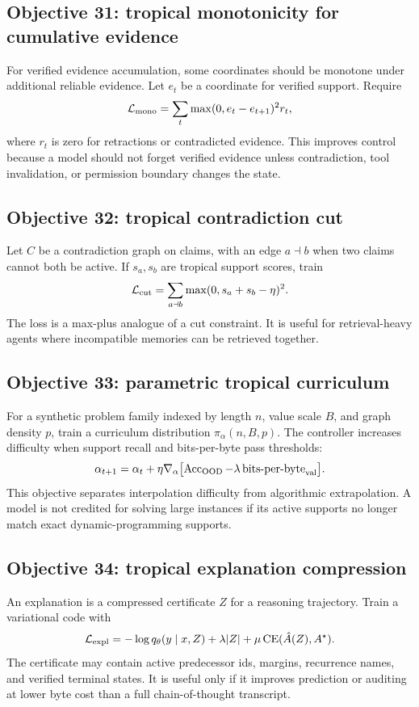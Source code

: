 \documentclass[11pt]{article}
\newcommand{\calL}{\mathcal{L}}
\begin{document}
\subsection{Objective 31: tropical monotonicity for cumulative evidence}
For verified evidence accumulation, some coordinates should be monotone under additional reliable evidence. Let $e_t$ be a coordinate for verified support. Require
\begin{equation}
\calL_{\rm mono}=\sum_t\max(0,e_t-e_{t+1})^2 r_t,
\end{equation}
where $r_t$ is zero for retractions or contradicted evidence. This improves control because a model should not forget verified evidence unless contradiction, tool invalidation, or permission boundary changes the state.

\subsection{Objective 32: tropical contradiction cut}
Let $C$ be a contradiction graph on claims, with an edge $a\dashv b$ when two claims cannot both be active. If $s_a,s_b$ are tropical support scores, train
\begin{equation}
\calL_{\rm cut}=\sum_{a\dashv b}\max(0,s_a+s_b-\eta)^2.
\end{equation}
The loss is a max-plus analogue of a cut constraint. It is useful for retrieval-heavy agents where incompatible memories can be retrieved together.

\subsection{Objective 33: parametric tropical curriculum}
For a synthetic problem family indexed by length $n$, value scale $B$, and graph density $p$, train a curriculum distribution $\pi_\alpha(n,B,p)$. The controller increases difficulty when support recall and bits-per-byte pass thresholds:
\begin{equation}
\alpha_{t+1}=\alpha_t+\eta\nabla_\alpha\bigl[\operatorname{Acc}_{\rm OOD}-\lambda\operatorname{bits-per-byte}_{\rm val}\bigr].
\end{equation}
This objective separates interpolation difficulty from algorithmic extrapolation. A model is not credited for solving large instances if its active supports no longer match exact dynamic-programming supports.

\subsection{Objective 34: tropical explanation compression}
An explanation is a compressed certificate $Z$ for a reasoning trajectory. Train a variational code with
\begin{equation}
\calL_{\rm expl}=-\log q_\theta(y\mid x,Z)+\lambda |Z|+\mu\operatorname{CE}(\hat A(Z),A^\star).
\end{equation}
The certificate may contain active predecessor ids, margins, recurrence names, and verified terminal states. It is useful only if it improves prediction or auditing at lower byte cost than a full chain-of-thought transcript.
\end{document}
